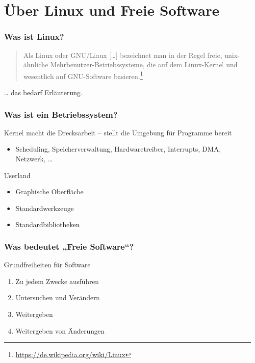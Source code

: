 \documentclass[t]{beamer}
\begin{document}
\section{Über Linux und Freie Software}
\begin{frame}
  \frametitle{Was ist Linux?}
  \begin{quote}
    Als Linux oder GNU/Linux […] bezeichnet man in
    der Regel freie, unix-ähnliche Mehrbenutzer-Betriebssysteme, die
    auf dem Linux-Kernel und wesentlich auf GNU-Software
    basieren.\footnote{\url{https://de.wikipedia.org/wiki/Linux}}
  \end{quote}
  \begin{center}
    \Large … das bedarf Erläuterung.
  \end{center}
\end{frame}

\begin{frame}
  \frametitle{Was ist ein Betriebssystem?}
  \begin{block}{Kernel}
    macht die Drecksarbeit – stellt die Umgebung für Programme bereit
    \begin{itemize}
    \item Scheduling, Speicherverwaltung, Hardwaretreiber, Interrupts,
      DMA, Netzwerk, …
    \end{itemize}
  \end{block}
  \begin{block}{Userland}
    \begin{itemize}
    \item Graphische Oberfläche
    \item Standardwerkzeuge
    \item Standardbibliotheken
    \end{itemize}
  \end{block}
\end{frame}

\begin{frame}
  \frametitle{Was bedeutet „Freie Software“?}
  \begin{block}{Grundfreiheiten für Software}
    \begin{enumerate}
    \item Zu jedem Zwecke ausführen
    \item Untersuchen und Verändern
    \item Weitergeben
    \item Weitergeben von Änderungen
    \end{enumerate}
  \end{block}
\end{frame}
\end{document}
